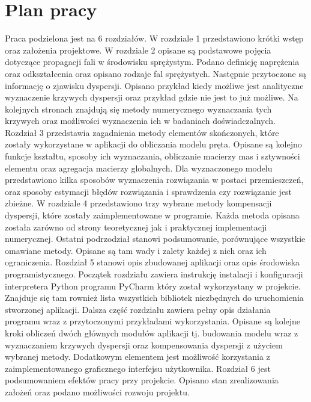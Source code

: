 \section{Plan pracy}
\label{sec:plan_pracy}

Praca podzielona jest na 6 rozdziałów. W rozdziale 1 przedstawiono krótki wstęp oraz założenia projektowe. W rozdziale 2 opisane są podstawowe pojęcia dotyczące propagacji fali w środowisku sprężystym. Podano definicję naprężenia oraz odkształcenia oraz opisano rodzaje fal sprężystych. Następnie przytoczone są informację o zjawisku dyspersji. Opisano przykład kiedy możliwe jest analityczne wyznaczenie krzywych dyspersji oraz przykład gdzie nie jest to już możliwe. Na kolejnych stronach znajdują się metody numerycznego wyznaczania tych krzywych oraz możliwości wyznaczenia ich w badaniach doświadczalnych. Rozdział 3 przedstawia zagadnienia metody elementów skończonych, które zostały wykorzystane w aplikacji do obliczania modelu pręta. Opisane są kolejno funkcje kształtu, sposoby ich wyznaczania, obliczanie macierzy mas i sztywności elementu oraz agregacja macierzy globalnych. Dla wyznaczonego modelu przedstawiono kilka sposobów wyznaczenia rozwiązania w postaci przemieszczeń, oraz sposoby estymacji błędów rozwiązania i sprawdzenia czy rozwiązanie jest zbieżne. W rozdziale 4 przedstawiono trzy wybrane metody kompensacji dyspersji, które zostały zaimplementowane w programie. Każda metoda opisana została zarówno od strony teoretycznej jak i praktycznej implementacji numerycznej. Ostatni podrzodział stanowi podsumowanie, porównujące wszystkie omawiane metody. Opisane są tam wady i zalety każdej z nich oraz ich ograniczenia. Rozdział 5 stanowi opis zbudowanej aplikacji oraz opis środowiska programistycznego. Początek rozdziału zawiera instrukcję instalacji i konfiguracji interpretera Python programu PyCharm  który został wykorzystany w projekcie. Znajduje się tam rownież lista wszystkich bibliotek niezbędnych do uruchomienia stworzonej aplikacji. Dalsza część rozdziału zawiera pełny opis działania programu wraz z przytoczonymi przykładami wykorzystania. Opisane są kolejne kroki obliczeń dwóch głównych modułów aplikacji tj. budowania modelu wraz z wyznaczaniem krzywych dyspersji oraz kompensowania dyspersji z użyciem wybranej metody. Dodatkowym elementem jest możliwość korzystania z zaimplementowanego graficznego interfejsu użytkownika. Rozdział 6 jest podsumowaniem efektów pracy przy projekcie. Opisano stan zrealizowania założeń oraz podano możliwości rozwoju projektu.




















